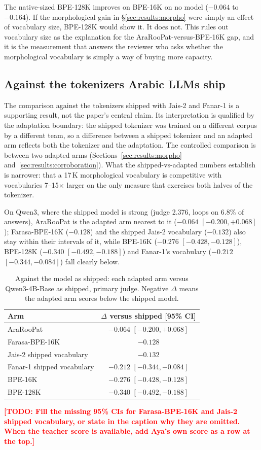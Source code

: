 \documentclass[a4paper,fleqn]{cas-sc}
\newcommand{\todo}[1]{\textcolor{red}{\textbf{[\textsc{TODO}: #1]}}}
\begin{document}
The native-sized BPE-128K improves on BPE-16K on no model ($-0.064$ to $-0.164$). If the morphological gain in \S\ref{sec:results:morpho} were simply an effect of vocabulary size, BPE-128K would show it. It does not. This rules out vocabulary size as the explanation for the AraRooPat-versus-BPE-16K gap, and it is the measurement that answers the reviewer who asks whether the morphological vocabulary is simply a way of buying more capacity.

\subsection{Against the tokenizers Arabic LLMs ship}
\label{sec:results:shipped}

The comparison against the tokenizers shipped with Jais-2 and Fanar-1 is a supporting result, not the paper's central claim. Its interpretation is qualified by the adaptation boundary: the shipped tokenizer was trained on a different corpus by a different team, so a difference between a shipped tokenizer and an adapted arm reflects both the tokenizer and the adaptation. The controlled comparison is between two adapted arms (Sections~\ref{sec:results:morpho} and~\ref{sec:results:corroboration}). What the shipped-vs-adapted numbers establish is narrower: that a 17\,K morphological vocabulary is competitive with vocabularies 7--15$\times$ larger on the only measure that exercises both halves of the tokenizer.

On Qwen3, where the shipped model is strong (judge 2.376, loops on 6.8\% of answers), AraRooPat is the adapted arm nearest to it ($-0.064$ $[-0.200,+0.068]$); Farasa-BPE-16K ($-0.128$) and the shipped Jais-2 vocabulary ($-0.132$) also stay within their intervals of it, while BPE-16K ($-0.276$ $[-0.428,-0.128]$), BPE-128K ($-0.340$ $[-0.492,-0.188]$) and Fanar-1's vocabulary ($-0.212$ $[-0.344,-0.084]$) fall clearly below.

\begin{table}[t]
\centering
\caption{Against the model as shipped: each adapted arm versus Qwen3-4B-Base as shipped, primary judge. Negative $\Delta$ means the adapted arm scores below the shipped model.}
\label{tab:shipped}
\begin{tabular}{@{}lc@{}}
\toprule
Arm & $\Delta$ versus shipped [95\% CI] \\
\midrule
AraRooPat & $-0.064$ $[-0.200,+0.068]$ \\
Farasa-BPE-16K & $-0.128$ \\
Jais-2 shipped vocabulary & $-0.132$ \\
Fanar-1 shipped vocabulary & $-0.212$ $[-0.344,-0.084]$ \\
BPE-16K & $-0.276$ $[-0.428,-0.128]$ \\
BPE-128K & $-0.340$ $[-0.492,-0.188]$ \\
\bottomrule
\end{tabular}
\vspace{2pt}
\raggedright\footnotesize
\todo{Fill the missing 95\% CIs for Farasa-BPE-16K and Jais-2 shipped vocabulary, or state in the caption why they are omitted. When the teacher score is available, add Aya's own score as a row at the top.}
\end{table}
\end{document}
